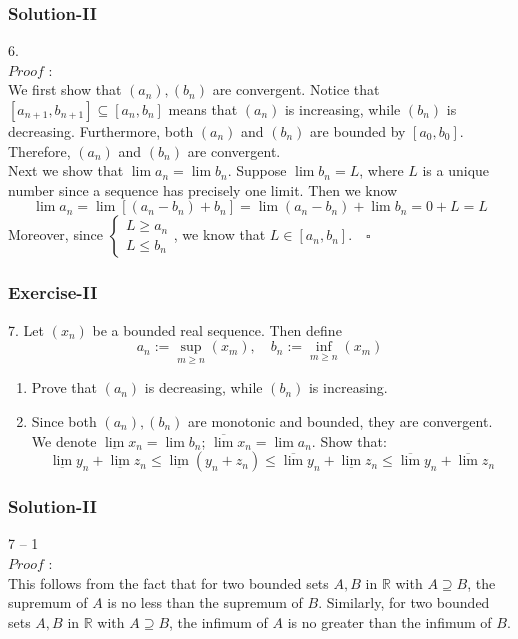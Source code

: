 \documentclass[12pt, t]{beamer}
\begin{document}
\begin{frame}
    \frametitle{Solution-II}
6.\\
$Proof$ : \\
\hspace{1em} We first show that $(a_n),(b_n)$ are convergent. Notice that $[a_{n+1}, b_{n+1}]\subseteq [a_n,b_n]$ 
means that $(a_n)$ is increasing, while $(b_n)$ is decreasing. Furthermore, both $(a_n)$ and $(b_n)$ are bounded by 
$[a_0,b_0]$. Therefore, $(a_n)$ and $(b_n)$ are convergent.\\
\hspace{1em} Next we show that $\lim a_n=\lim b_n$. Suppose $\lim b_n=L$, where $L$ is a unique number since a sequence 
has precisely one limit. Then we know 
\begin{equation*}
    \lim a_n=\lim [(a_n-b_n)+b_n]=\lim (a_n-b_n) + \lim b_n= 0+L=L
\end{equation*}
Moreover, since 
$\begin{cases}
    L \geq a_n\\
    L \leq b_n
\end{cases}$, we know that $L\in [a_n,b_n]$.$\quad\square$

\end{frame}

\begin{frame}
    \frametitle{Exercise-II}
7. Let $(x_n)$ be a bounded real sequence. Then define
\begin{equation*}
     a_n:=\sup_{m\geq n}(x_m),\quad b_n:=\inf_{m\geq n}(x_m) 
\end{equation*}

\begin{enumerate}
    \item Prove that $(a_n)$ is decreasing, while $(b_n)$ is increasing.
    \item Since both $(a_n),(b_n)$ are monotonic and bounded, they are convergent. 
        We denote $\underline{\lim} x_n=\lim b_n$; $\overline{\lim}x_n=\lim a_n$. Show that:
        \begin{equation*}
            \underline{\lim}y_n+\underline{\lim}z_n\leq \underline{\lim} (y_n+z_n)\leq\overline{\lim}y_n+\underline{\lim}z_n\leq\overline{\lim}y_n+\overline{\lim}z_n
        \end{equation*}
\end{enumerate}
\end{frame}

\begin{frame}
    \frametitle{Solution-II}
7 -- 1\\
$Proof$ : \\
\hspace{1em} This follows from the fact that for two bounded sets $A,B$ in $\mathbb{R}$ with $A\supseteq B$, the supremum of $A$ is no less than 
the supremum of $B$.  Similarly, for two bounded sets $A,B$ in $\mathbb{R}$ with $A\supseteq B$, the infimum of $A$ is no greater than the infimum of $B$.


\end{frame}
\end{document}
